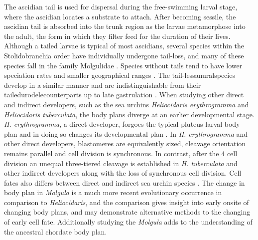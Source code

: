 The ascidian tail is used for dispersal during the free-swimming larval stage, where the ascidian locates a substrate to attach. After becoming sessile, the ascidian tail is absorbed into the trunk region as the larvae metamorphose into the adult, the form in which they filter feed for the duration of their lives. Although a tailed larvae is typical of most ascidians, several species within the Stolidobranchia order have individually undergone tail-loss, and many of these species fall in the family Molgulidae \cite{berrill_studies_1931, jeffery_evolution_1999, huber_evolution_2000, maliska_molgula_2010}. Species without tails tend to have lower speciation rates and smaller geographical ranges \cite{maliska_developmental_2013}. The tail-less\textemdash anural\textemdash species develop in a similar manner and are indistinguishable from their tailed\textemdash urodele\textemdash counterparts up to late gastrulation \cite{berrill_studies_1931, swalla_interspecific_1990, jeffery_factors_1992}. When studying other direct and indirect developers, such as the sea urchins \textit{Heliocidaris erythrogramma} and  \textit{Heliocidaris tuberculata}, the body plans diverge at an earlier developmental stage. \textit{H. erythrogramma}, a direct developer, forgoes the typical pluteus larval body plan and in doing so changes its developmental plan \cite{henry_evolutionary_1990}. In \textit{H. erythrogramma} and other direct developers, blastomeres are equivalently sized, cleavage orientation remains parallel and cell division is synchronous. In contrast, after the 4 cell division an unequal three-tiered cleavage is established in \textit{H. tuberculata} and other indirect developers along with the loss of synchronous cell division. Cell fates also differs between direct and indirect sea urchin species \cite{wray_evolutionary_1989}. The change in body plan in \textit{Molgula} is a much more recent evolutionary occurrence in comparison to \textit{Heliocidaris}, %
and the comparison gives insight into early onsite of changing body plans, and may demonstrate alternative methods to the changing of early cell fate. Additionally studying the \textit{Molgula} adds to the understanding of the ancestral chordate body plan.  

